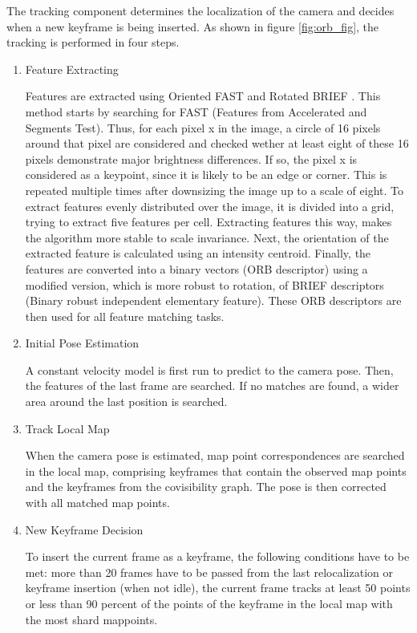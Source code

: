 	The tracking component determines the localization of the camera and decides when a new keyframe is being inserted.
	As shown in figure \ref{fig:orb_fig}, the tracking is performed in four steps.
	
	\begin{enumerate}
	\item Feature Extracting 
	
	Features are extracted using Oriented FAST and Rotated BRIEF \cite{orb_feat}. This method starts by searching for 
	FAST (Features from Accelerated and Segments Test). Thus, for each pixel x in the image, a circle of 16 pixels around that pixel
	are considered and checked wether at least eight of these 16 pixels demonstrate major brightness differences. If so, the pixel x is considered as 
	a keypoint, since it is likely to be an edge or corner. This is repeated multiple times after downsizing the image up to a scale of eight. 
	To extract features evenly distributed over the image, it is divided into a grid, trying to extract five features per cell. 
	Extracting features this way, makes the algorithm more stable to scale invariance. 
	Next, the orientation of the extracted feature is calculated using an intensity centroid. 
	Finally, the features are converted into a binary vectors (ORB descriptor) using a modified version, which is more robust to rotation, of BRIEF descriptors (Binary robust independent elementary feature).
	These ORB descriptors are then used for all feature matching tasks. 
	
	
	\item Initial Pose Estimation
	
	A constant velocity model is first run to predict to the camera pose. Then, the features of the last frame are searched. If no matches are found, 
	a wider area around the last position is searched. 
	
	\item Track Local Map 
	
	When the camera pose is estimated, map point correspondences are searched in 
	the local map, comprising keyframes that contain the observed map points and
	the keyframes from the covisibility graph. The pose is then corrected with all
	matched map points. 
	
	
	
	\item New Keyframe Decision 
	
	To insert the current frame as a keyframe, the following conditions have to be met:
	more than 20 frames have to be passed from the last relocalization or keyframe insertion (when not idle), 
    the current frame tracks at least 50 points or less than 90 percent of the points of the keyframe in the local 
    map with the most shard mappoints. 	
	
	
	\end{enumerate}
	
